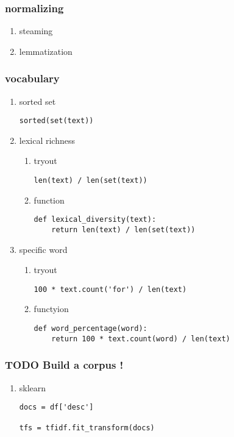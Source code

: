 \documentclass[11pt]{article}
\begin{document}
\subsubsection{normalizing}
\label{sec:org2a2c376}
\begin{enumerate}
\item steaming
\label{sec:org283f545}
\item lemmatization
\label{sec:org029bcff}
\end{enumerate}
\subsubsection{vocabulary}
\label{sec:orgdee898a}
\begin{enumerate}
\item sorted set
\label{sec:orgb126daa}
\begin{verbatim}
sorted(set(text))
\end{verbatim}
\item lexical richness
\label{sec:org68ddc83}
\begin{enumerate}
\item tryout
\label{sec:orgddfd8b8}
\begin{verbatim}
len(text) / len(set(text))
\end{verbatim}

\item function
\label{sec:org63d231c}
\begin{verbatim}
def lexical_diversity(text):
    return len(text) / len(set(text))
\end{verbatim}
\end{enumerate}
\item specific word
\label{sec:org905ec00}
\begin{enumerate}
\item tryout
\label{sec:org750d4ac}
\begin{verbatim}
100 * text.count('for') / len(text)
\end{verbatim}
\item functyion
\label{sec:org003537e}
\begin{verbatim}
def word_percentage(word):
    return 100 * text.count(word) / len(text)
\end{verbatim}
\end{enumerate}
\end{enumerate}

\subsubsection{{\bfseries\sffamily TODO} Build a corpus !}
\label{sec:orgd6c1245}

\begin{enumerate}
\item sklearn
\label{sec:orgba20ed4}
\begin{verbatim}
docs = df['desc']

tfs = tfidf.fit_transform(docs)
\end{verbatim}
\end{enumerate}
\end{document}

